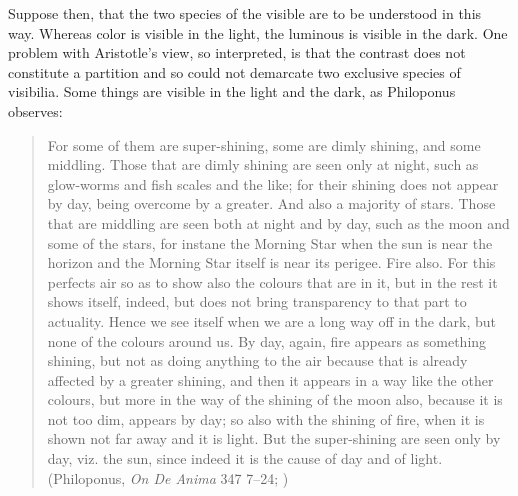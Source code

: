 Suppose then, that the two species of the visible are to be understood in this way. Whereas color is visible in the light, the luminous is visible in the dark. One problem with Aristotle's view, so interpreted, is that the contrast does not constitute a partition and so could not demarcate two exclusive species of visibilia. Some things are visible in the light and the dark, as Philoponus observes:
\begin{quote}
	For some of them are super-shining, some are dimly shining, and some middling. Those that are dimly shining are seen only at night, such as glow-worms and fish scales and the like; for their shining does not appear by day, being overcome by a greater. And also a majority of stars. Those that are middling are seen both at night and by day, such as the moon and some of the stars, for instane the Morning Star when the sun is near the horizon and the Morning Star itself is near its perigee. Fire also. For this perfects air so as to show also the colours that are in it, but in the rest it shows itself, indeed, but does not bring transparency to that part to actuality. Hence we see itself when we are a long way off in the dark, but none of the colours around us. By day, again, fire appears as something shining, but not as doing anything to the air because that is already affected by a greater shining, and then it appears in a way like the other colours, but more in the way of the shining of the moon also, because it is not too dim, appears by day; so also with the shining of fire, when it is shown not far away and it is light. But the super-shining are seen only by day, viz. the sun, since indeed it is the cause of day and of light. (Philoponus, \emph{On \emph{De Anima}} 347 7--24; \citealt[32]{Charlton:2005fk})
\end{quote}

